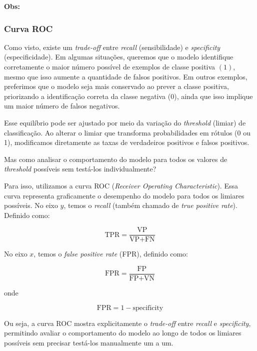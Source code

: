 \documentclass{article}
\begin{document}
\textbf{Obs:}

\subsubsection{Curva ROC}

Como visto, existe um \textit{trade-off} entre \textit{recall} (sensibilidade)
e \textit{specificity} (especificidade). Em algumas situações, queremos que o
modelo identifique corretamente o maior número possível de exemplos de classe 
positiva $(1)$, mesmo que isso aumente a quantidade de falsos positivos. Em outros
exemplos, preferimos que o modelo seja mais conservado ao prever a classe positiva,
priorizando a identificação correta da classe negativa ($0$), ainda que isso 
implique um maior número de falsos negativos.

Esse equilíbrio pode ser ajustado por meio da variação do \textit{threshold} 
(limiar) de classificação. Ao alterar o limiar que transforma probabilidades 
em rótulos (0 ou 1), modificamos diretamente as taxas de verdadeiros positivos
e falsos positivos.

Mas como analisar o comportamento do modelo para todos os valores de 
\textit{threshold} possíveis sem testá-los individualmente?

Para isso, utilizamos a curva ROC (\textit{Receiver Operating Characteristic}).
Essa curva representa graficamente o desempenho do modelo para todos os limiares
possíveis. No eixo $y$, temos o \textit{recall} (também chamado de 
\textit{true positive rate}). Definido como:

\begin{equation*}
    \text{TPR} = \frac{\text{VP}}{\text{VP} + \text{FN}}
\end{equation*}

No eixo $x$, temos o \textit{false positive rate} (FPR), definido como:

\begin{equation*}
    \text{FPR} = \frac{\text{FP}}{\text{FP} + \text{VN}}
\end{equation*}

onde

\begin{equation*}
    \text{FPR} = 1 - \text{specificity}
\end{equation*}

Ou seja, a curva ROC mostra explicitamente o \textit{trade-off} entre 
\textit{recall} e \textit{specificity}, permitindo avaliar o comportamento 
do modelo ao longo de todos os limiares possíveis sem precisar testá-los 
manualmente um a um.
\end{document}
